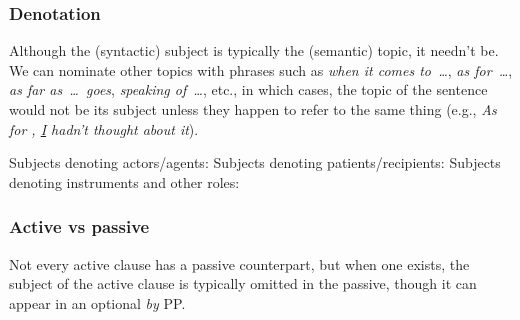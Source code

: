 \subsubsection*{Denotation} \label{sec:subject-denotation}
Although the (syntactic) subject is typically the (semantic) topic, it needn't be. We can nominate other topics with phrases such as \textit{when it comes to~\dots}, \textit{as for~\dots}, \textit{as far as~\dots~goes}, \textit{speaking of~\dots}, etc., in which cases, the topic of the sentence would not be its subject unless they happen to refer to the same thing (e.g., \textit{As for , \uline{I} hadn't thought about it}).

\ea
    \ea Subjects denoting actors/agents:
        \z
    \ex Subjects denoting patients/recipients:
        \z
    \ex Subjects denoting instruments and other roles:
        \z
    \z
\z

\subsubsection*{Active vs passive}
Not every active clause has a passive counterpart, but when one exists, the subject of the active clause is typically omitted in the passive, though it can appear in an optional \textit{by} PP. 

\ea\label{ex:passive-no-by}
    \z
\z

